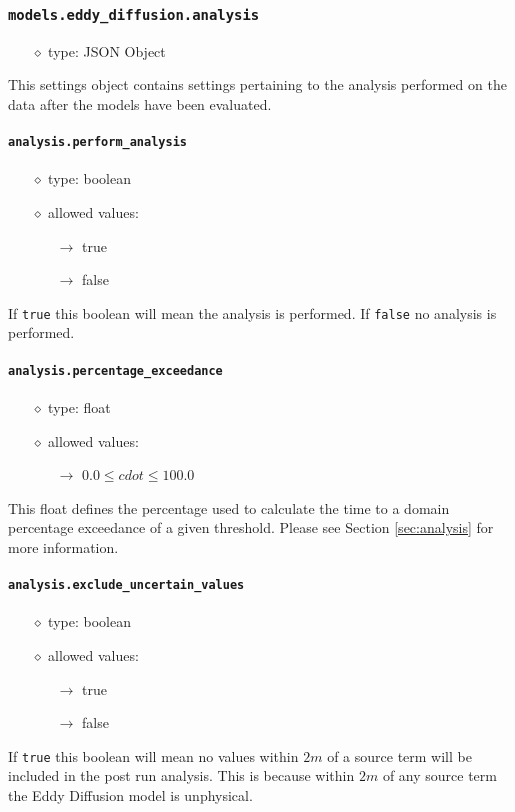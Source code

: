 \documentclass[]{article}
\def\code#1{\texttt{#1}}
\begin{document}
\subsubsection{\code{models.eddy\_diffusion.analysis}}
\begin{itemize}
    \item[$\diamond$] type: JSON Object 
\end{itemize}
This settings object contains settings pertaining to the analysis performed on
the data after the models have been evaluated.

\paragraph{\code{analysis.perform\_analysis}}\label{sec:percex}
\begin{itemize}
    \item[$\diamond$] type: boolean
    \item[$\diamond$] allowed values:
    \begin{itemize}
        \item[$\rightarrow$] true
        \item[$\rightarrow$] false
    \end{itemize}
\end{itemize}
If \code{true} this boolean will mean the analysis is performed. If \code{false}
no analysis is performed.

\paragraph{\code{analysis.percentage\_exceedance}}\label{sec:percex}
\begin{itemize}
    \item[$\diamond$] type: float
    \item[$\diamond$] allowed values:
    \begin{itemize}
        \item[$\rightarrow$] $0.0\leq cdot\leq 100.0$
    \end{itemize}
\end{itemize}
This float defines the percentage used to calculate the time to a domain
percentage exceedance of a given threshold. Please see Section
\ref{sec:analysis} for more information.

\paragraph{\code{analysis.exclude\_uncertain\_values}}
\begin{itemize}
    \item[$\diamond$] type: boolean
    \item[$\diamond$] allowed values:
    \begin{itemize}
        \item[$\rightarrow$] true
        \item[$\rightarrow$] false
    \end{itemize}
\end{itemize}
If \code{true} this boolean will mean no values within $2m$ of a source term
will be included in the post run analysis. This is because within $2m$ of any
source term the Eddy Diffusion model is unphysical.
\end{document}
